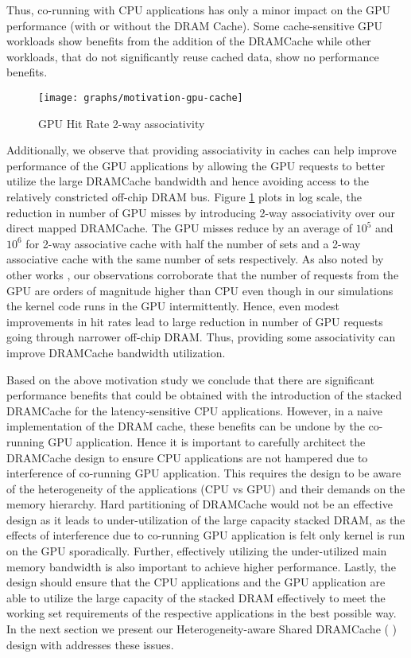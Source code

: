 Thus,  co-running with CPU applications has only a minor impact on the GPU performance (with or without the DRAM Cache). 
Some cache-sensitive GPU workloads show benefits from the addition of the DRAMCache while other workloads, that do not significantly reuse cached data, show no performance benefits.
\begin{figure}[htb]
   \texttt{[image: graphs/motivation-gpu-cache]}
   \caption{GPU Hit Rate 2-way associativity}
   \label{fig:motivation-gpu-cache}
\end{figure}
\par Additionally, we observe that providing associativity in caches can help improve performance of the GPU applications by allowing the GPU requests to better utilize the large  DRAMCache bandwidth and hence avoiding access to the relatively constricted off-chip DRAM bus. Figure \ref{fig:motivation-gpu-cache} plots in log scale, the reduction in number of GPU misses by introducing 2-way associativity over our direct mapped DRAMCache. The GPU misses reduce by an average of $10^5$ and $10^6$ for 2-way associative cache with half the number of sets  and a 2-way associative cache with the same number of sets respectively. As also noted by other works \cite{oscar}, our observations corroborate that the number of requests from the GPU are orders of magnitude higher than CPU even though in our simulations the kernel code runs in the GPU intermittently. Hence, even modest improvements in hit rates lead to large reduction in number of GPU requests going through narrower off-chip DRAM. Thus, providing some associativity can improve DRAMCache bandwidth utilization.
\par Based on the above motivation study we conclude that there are significant performance benefits that could be obtained 
with the introduction of the stacked DRAMCache for the latency-sensitive CPU applications. However, in a naive implementation
of the DRAM cache, these benefits can be undone by the co-running GPU application.  Hence it is important to carefully 
architect the DRAMCache design to ensure CPU applications are not hampered due to interference of co-running GPU application.
This requires the design to be aware of the heterogeneity of the applications (CPU vs GPU) and their demands on the 
memory hierarchy.  Hard partitioning of DRAMCache would not be an effective design as it leads to under-utilization of the large capacity 
stacked DRAM, as the effects of interference due to co-running GPU application is felt only kernel is run on the GPU sporadically. 
Further, effectively utilizing the under-utilized main memory bandwidth \cite{micro-refresh, mainak-hpca, bear}
is also important to achieve higher performance.  Lastly, the design should ensure that the CPU applications and the 
GPU application are able to utilize the large capacity of the stacked DRAM effectively to meet the working set 
requirements of the respective applications in the best possible way. In the next section we present our Heterogeneity-aware Shared DRAMCache ( \cachename) design with addresses these issues.
